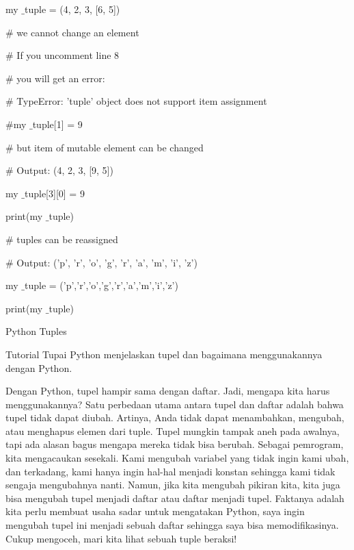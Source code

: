 \vspace{12pt}
my $  \_  $tuple = (4, 2, 3, [6, 5]) \par
\vspace{12pt}
 $  \#  $ we cannot change an element \par
 $  \#  $ If you uncomment line 8 \par
 $  \#  $ you will get an error: \par
 $  \#  $ TypeError: 'tuple' object does not support item assignment \par
\vspace{12pt}
 $  \#  $my $  \_  $tuple[1] = 9 \par
\vspace{12pt}
 $  \#  $ but item of mutable element can be changed \par
 $  \#  $ Output: (4, 2, 3, [9, 5]) \par
my $  \_  $tuple[3][0] = 9 \par
print(my $  \_  $tuple) \par
\vspace{12pt}
 $  \#  $ tuples can be reassigned \par
 $  \#  $ Output: ('p', 'r', 'o', 'g', 'r', 'a', 'm', 'i', 'z') \par
my $  \_  $tuple = ('p','r','o','g','r','a','m','i','z') \par
print(my $  \_  $tuple) \par
\vspace{12pt}
 \hspace*{0.5in} \vspace{12pt}
Python Tuples \par
Tutorial Tupai Python menjelaskan tupel dan bagaimana menggunakannya dengan Python. \par
Dengan Python, tupel hampir sama dengan daftar. Jadi, mengapa kita harus menggunakannya? Satu perbedaan utama antara tupel dan daftar adalah bahwa tupel tidak dapat diubah. Artinya, Anda tidak dapat menambahkan, mengubah, atau menghapus elemen dari tuple. Tupel mungkin tampak aneh pada awalnya, tapi ada alasan bagus mengapa mereka tidak bisa berubah. Sebagai pemrogram, kita mengacaukan sesekali. Kami mengubah variabel yang tidak ingin kami ubah, dan terkadang, kami hanya ingin hal-hal menjadi konstan sehingga kami tidak sengaja mengubahnya nanti. Namun, jika kita mengubah pikiran kita, kita juga bisa mengubah tupel menjadi daftar atau daftar menjadi tupel. Faktanya adalah kita perlu membuat usaha sadar untuk mengatakan Python, saya ingin mengubah tupel ini menjadi sebuah daftar sehingga saya bisa memodifikasinya. Cukup mengoceh, mari kita lihat sebuah tuple beraksi! \par
